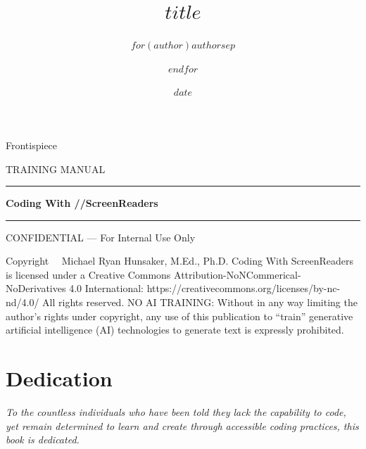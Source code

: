 \documentclass[
  justified,
  openright,
$if(classoption)$
  $for(classoption)$
    $classoption$$sep$,
  $endfor$
$endif$
]{tufte-book}
\title{$title$}
\author{$for(author)$$author$$sep$ \and $endfor$}
\date{$date$}
\begin{document}
\frontmatter
\pagestyle{fancy}

\thispagestyle{empty}
\null
\clearpage

\thispagestyle{empty}
\begin{center}
  \vspace*{0.35\textheight}
  {\sffamily\large Frontispiece}
\end{center}
\clearpage

\begin{titlepage}
    \vspace*{1.6in}
    {\sffamily\fontsize{9}{11}\selectfont\MakeUppercase{Training Manual}}
    \vspace{0.3in}
    {\color{BrandAccent}\rule{4.5in}{2pt}}
    \vspace{0.25in}
    {\sffamily\bfseries\fontsize{32}{38}\selectfont Coding With //ScreenReaders}
    \vspace{0.2in}
    {\color{BrandAccent}\rule{4.5in}{0.6pt}}
    \vspace{0.5in}
    \vfill
    {\sffamily\fontsize{7.5}{9}\selectfont\color{MidGray}%
      CONFIDENTIAL --- For Internal Use Only%
    }
  \clearpage
  \nopagecolor
\end{titlepage}

\thispagestyle{empty}
\vspace*{0.25\textheight}
{\small
\noindent Copyright \textcopyright\ \the\year\ Michael Ryan Hunsaker, M.Ed., Ph.D. Coding With ScreenReaders is licensed under a Creative Commons Attribution-NoNCommerical-NoDerivatives 4.0 International: https://creativecommons.org/licenses/by-nc-nd/4.0/
\noindent All rights reserved.
\noindent NO AI TRAINING: Without in any way limiting the author's rights under copyright, any use of this publication to “train” generative artificial intelligence (AI) technologies to generate text is expressly prohibited.
}
\clearpage

{
\hypersetup{linkcolor=BrandBlue}
\tableofcontents
\clearpage
}

\chapter*{Dedication}
\thispagestyle{empty}
\begin{center}
  \vspace*{0.3\textheight}
  {\itshape To the countless individuals who have been told they lack the capability to code, yet remain determined to learn and create through accessible coding practices, this book is dedicated.}\\[1em]
\end{center}
\clearpage
\end{document}
